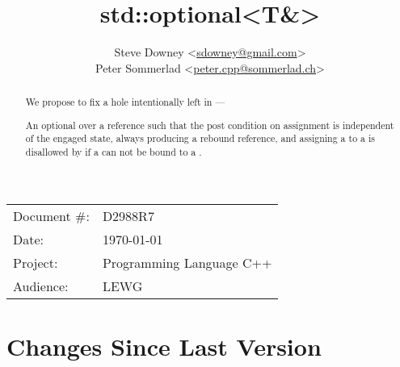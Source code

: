 \documentclass[a4paper,10pt,oneside,openany,final,article]{memoir}
\begin{document}
\title{std::optional<T\&>}
\author{
  Steve Downey \small<\href{mailto:sdowney@gmail.com}{sdowney@gmail.com}> \\
  Peter Sommerlad \small<\href{mailto:peter.cpp@sommerlad.ch}{peter.cpp@sommerlad.ch}> \\
}
\date{} %
\maketitle

\begin{flushright}
  \begin{tabular}{ll}
    Document \#: & D2988R7 \\
    Date: & \today \\
    Project: & Programming Language C++ \\
    Audience: & LEWG
  \end{tabular}
\end{flushright}

\begin{abstract}
  We propose to fix a hole intentionally left in  ---

  An optional over a reference such that the post condition on assignment is independent of the engaged state, always producing a rebound reference, and assigning a  to a  is disallowed by  if a  can not be bound to a .
\end{abstract}

\tableofcontents*

\chapter*{Changes Since Last Version}
\end{document}

